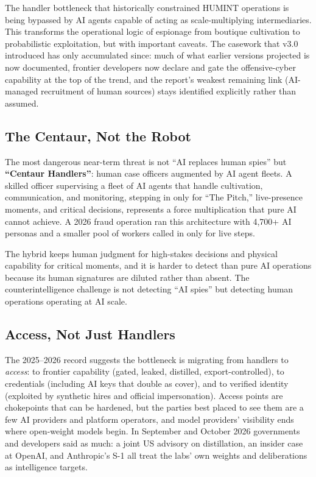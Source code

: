 \documentclass[11pt,letterpaper]{article}
\begin{document}
The handler bottleneck that historically constrained HUMINT operations is being bypassed by AI agents capable of acting as scale-multiplying intermediaries. This transforms the operational logic of espionage from boutique cultivation to probabilistic exploitation, but with important caveats. The casework that v3.0 introduced has only accumulated since: much of what earlier versions projected is now documented, frontier developers now declare and gate the offensive-cyber capability at the top of the trend, and the report's weakest remaining link (AI-managed recruitment of human sources) stays identified explicitly rather than assumed.

\subsection{The Centaur, Not the Robot}

\begin{keybox}
The most dangerous near-term threat is not ``AI replaces human spies'' but \textbf{``Centaur Handlers''}: human case officers augmented by AI agent fleets. A skilled officer supervising a fleet of AI agents that handle cultivation, communication, and monitoring, stepping in only for ``The Pitch,'' live-presence moments, and critical decisions, represents a force multiplication that pure AI cannot achieve. A 2026 fraud operation ran this architecture with 4,700+ AI personas and a smaller pool of workers called in only for live steps.
\end{keybox}

The hybrid keeps human judgment for high-stakes decisions and physical capability for critical moments, and it is harder to detect than pure AI operations because its human signatures are diluted rather than absent. The counterintelligence challenge is not detecting ``AI spies'' but detecting human operations operating at AI scale.

\subsection{Access, Not Just Handlers}

The 2025--2026 record suggests the bottleneck is migrating from handlers to \textit{access}: to frontier capability (gated, leaked, distilled, export-controlled), to credentials (including AI keys that double as cover), and to verified identity (exploited by synthetic hires and official impersonation). Access points are chokepoints that can be hardened, but the parties best placed to see them are a few AI providers and platform operators, and model providers' visibility ends where open-weight models begin. In September and October 2026 governments and developers said as much: a joint US advisory on distillation, an insider case at OpenAI, and Anthropic's S-1 all treat the labs' own weights and deliberations as intelligence targets.
\end{document}
